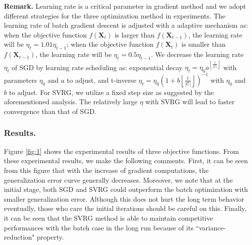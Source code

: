 \documentclass[letterpaper]{article}
\begin{document}
		\textbf{Remark. }Learning rate is a critical parameter in gradient method and we adopt different strategies for the three optimization method in experiments. The learning rate of batch gradient descent is adjusted with a adaptive mechanism as: when the objective function $f(\mathbf{X}_t)$ is larger than $f(\mathbf{X}_{t-1})$, the learning rate will be $\eta_t=1.01\eta_{t-1}$; when the objective function $f(\mathbf{X}_t)$ is smaller than $f(\mathbf{X}_{t-1})$, the learning rate will be $\eta_t=0.5\eta_{t-1}$. We decrease the learning rate $\eta_t$ of SGD by learning rate scheduling as: exponential decay $\eta_t = \eta_0 a^{\left \lfloor \frac{t}{|\mathcal{C}|} \right \rfloor}$ with parameters $\eta_0$ and $a$ to adjust, and t-inverse $\eta_t = \eta_0(1 + b\left \lfloor \frac{t}{|\mathcal{C}|} \right \rfloor)^{-1}$ with $\eta_0$ and $b$ to adjust. For SVRG, we utilize a fixed step size as suggested by the aforementioned analysis. The relatively large $\eta$ with SVRG will lead to faster convergence than that of SGD.

		\subsubsection{Results.}
		Figure \ref{fig:1} shows the experimental results of three objective functions. From these experimental results, we make the following comments. First, it can be seen from this figure that with the increase of gradient computations, the generalization error curve generally decreases. Moreover, we note that at the initial stage, both SGD and SVRG could outperform the batch optimization with smaller generalization error. Although this does not hurt the long term behavior eventually, those who care the initial iterations should be careful on this. Finally, it can be seen that the SVRG method is able to maintain competitive performances with the batch case in the long run because of its ``variance-reduction" property.

\end{document}
